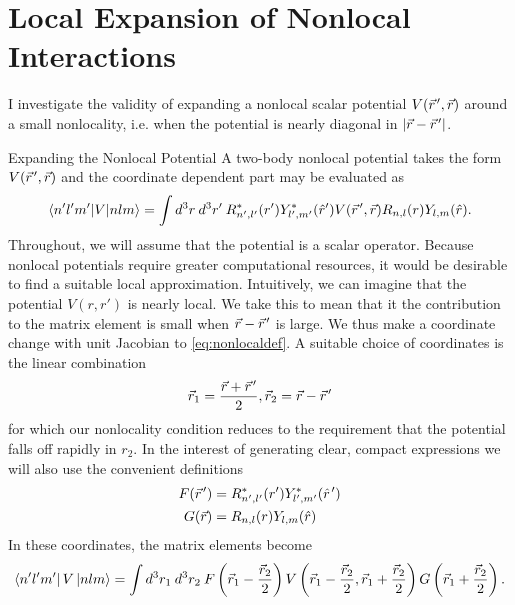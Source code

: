 

\chapter{\label{chap:localExpansion}Local Expansion of Nonlocal Interactions}


I investigate the validity of expanding a nonlocal scalar potential $V(\vec{r}\mkern2mu',\vec{r})$ around a small nonlocality, i.e. when the potential is nearly diagonal in $|\vec{r}-\vec{r}\mkern2mu'|$. 


\begin{section}{Expanding the Nonlocal Potential}
A two-body nonlocal potential takes the form $V(\vec{r}\mkern2mu',\vec{r})$ and the coordinate dependent part may be evaluated as
\begin{equation}\label{eq:nonlocaldef}
\braket{n' l' m'| V | n l m}=\int d^3r\:d^3r'\:R^*_{n',l'}(r') Y^*_{l',m'}(\hat{r}') V(\vec{r}\mkern2mu',\vec{r}) R_{n,l}(r) Y_{l,m}(\hat{r}).
\end{equation}
Throughout, we will assume that the potential is a scalar operator. Because nonlocal potentials require greater computational resources, it would be desirable to find a suitable local approximation. Intuitively, we can imagine that the potential $V(r,r')$ is nearly local. We take this to mean that it the contribution to the matrix element is small when $\vec{r}-\vec{r}\mkern2mu'$ is large. We thus make a coordinate change with unit Jacobian to \eqref{eq:nonlocaldef}. A suitable choice of coordinates is the linear combination
\begin{equation}\label{eq:coords}
\vec{r}_1=\frac{\vec{r}+\vec{r}\mkern2mu'}{2},\vec{r}_2=\vec{r}-\vec{r}\mkern2mu'
\end{equation}
for which our nonlocality condition reduces to the requirement that the potential falls off rapidly in $r_2$. In the interest of generating clear, compact expressions we will also use the convenient definitions
\begin{align}
F(\vec{r}\mkern2mu')&=R^*_{n',l'}(r') Y^*_{l',m'}(\hat{r}\mkern2mu')\\
G(\vec{r})&=R_{n,l}(r) Y_{l,m}(\hat{r})
\end{align}
In these coordinates, the matrix elements become 
\begin{equation}
\bra{n' l' m'} V \ket{ n l m}= \int d^3r_1\:d^3r_2\:F\left( \vec{r}_1-\frac{\vec{r}_2}{2} \right) V\left(\vec{r}_1-\frac{\vec{r}_2}{2},\vec{r}_1+\frac{\vec{r}_2}{2}\right) 
G\left( \vec{r}_1+\frac{\vec{r}_2}{2}\right).
\end{equation}

\end{section}
